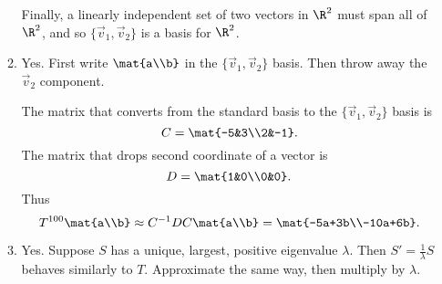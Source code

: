 \begin{enumerate}
\begin{enumerate}
					Finally, a linearly independent set of two vectors in $\R^2$ must span all of $\R^2$,
					and so $\{\vec v_1,\vec v_2\}$ is a basis for $\R^2$.
				\item Yes. First write $\mat{a\\b}$ in the $\{\vec v_1,\vec v_2\}$ basis. Then throw away
					the $\vec v_2$ component.

					The matrix that converts from the standard basis to the $\{\vec v_1,\vec v_2\}$ basis is
					\[
						C=\mat{-5&3\\2&-1}.
					\]
					The matrix that drops second coordinate of a vector is
					\[
						D=\mat{1&0\\0&0}.
					\]
					Thus
					\[
						T^{100}\mat{a\\b} \approx C^{-1}DC\mat{a\\b}=\mat{-5a+3b\\-10a+6b}.
					\]
				\item Yes. Suppose $S$ has a unique, largest, positive eigenvalue $\lambda$. Then $S'=\tfrac{1}{\lambda}S$
					behaves similarly to $T$. Approximate the same way, then multiply by $\lambda$.
			\end{enumerate}
		\end{enumerate}